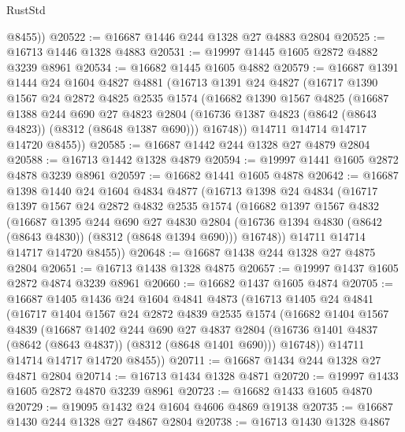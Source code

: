 \begin{lexlean}{RustStd}
\begin{coremodule}
        @8455))
@20522 := @16687 @1446 @244 @1328 @27 @4883 @2804
@20525 := @16713 @1446 @1328 @4883
@20531 := @19997 @1445 @1605 @2872 @4882 @3239 @8961
@20534 := @16682 @1445 @1605 @4882
@20579 := @16687
    @1391
    @1444
    @24
    @1604
    @4827
    @4881
    (@16713
      @1391
      @24
      @4827
      (@16717
        @1390
        @1567
        @24
        @2872
        @4825
        @2535
        @1574
        (@16682
          @1390
          @1567
          @4825
          (@16687
            @1388
            @244
            @690
            @27
            @4823
            @2804
            (@16736 @1387 @4823 (@8642 (@8643 @4823)) (@8312 (@8648 @1387 @690)))
            @16748))
        @14711
        @14714
        @14717
        @14720
        @8455))
@20585 := @16687 @1442 @244 @1328 @27 @4879 @2804
@20588 := @16713 @1442 @1328 @4879
@20594 := @19997 @1441 @1605 @2872 @4878 @3239 @8961
@20597 := @16682 @1441 @1605 @4878
@20642 := @16687
    @1398
    @1440
    @24
    @1604
    @4834
    @4877
    (@16713
      @1398
      @24
      @4834
      (@16717
        @1397
        @1567
        @24
        @2872
        @4832
        @2535
        @1574
        (@16682
          @1397
          @1567
          @4832
          (@16687
            @1395
            @244
            @690
            @27
            @4830
            @2804
            (@16736 @1394 @4830 (@8642 (@8643 @4830)) (@8312 (@8648 @1394 @690)))
            @16748))
        @14711
        @14714
        @14717
        @14720
        @8455))
@20648 := @16687 @1438 @244 @1328 @27 @4875 @2804
@20651 := @16713 @1438 @1328 @4875
@20657 := @19997 @1437 @1605 @2872 @4874 @3239 @8961
@20660 := @16682 @1437 @1605 @4874
@20705 := @16687
    @1405
    @1436
    @24
    @1604
    @4841
    @4873
    (@16713
      @1405
      @24
      @4841
      (@16717
        @1404
        @1567
        @24
        @2872
        @4839
        @2535
        @1574
        (@16682
          @1404
          @1567
          @4839
          (@16687
            @1402
            @244
            @690
            @27
            @4837
            @2804
            (@16736 @1401 @4837 (@8642 (@8643 @4837)) (@8312 (@8648 @1401 @690)))
            @16748))
        @14711
        @14714
        @14717
        @14720
        @8455))
@20711 := @16687 @1434 @244 @1328 @27 @4871 @2804
@20714 := @16713 @1434 @1328 @4871
@20720 := @19997 @1433 @1605 @2872 @4870 @3239 @8961
@20723 := @16682 @1433 @1605 @4870
@20729 := @19095 @1432 @24 @1604 @4606 @4869 @19138
@20735 := @16687 @1430 @244 @1328 @27 @4867 @2804
@20738 := @16713 @1430 @1328 @4867

\end{coremodule}
\end{lexlean}

